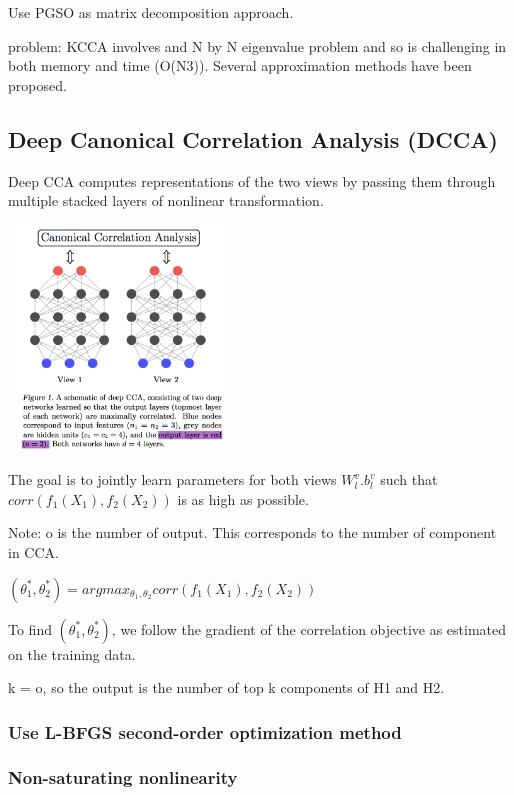 \documentclass[a4paper]{article}
\begin{document}
Use PGSO as matrix decomposition approach.

problem:
KCCA involves and N by N eigenvalue problem and so is challenging in both memory and time (O(N3)). Several approximation methods have been proposed.

\subsection{Deep Canonical Correlation Analysis (DCCA)}
Deep CCA computes representations of the two views by passing them
through multiple stacked layers of nonlinear transformation.

\begin{center}
\includegraphics[width=6cm, height=6cm]{dnet.png}
\end{center}


The goal is to jointly learn parameters for both views $W_l^v. b_l^v$ such that $corr(f_1(X_1),f_2(X_2))$ is as high as possible.

Note: o is the number of output. This corresponds to the number of component in CCA.

$(\theta_1^*,\theta_2^*) = argmax_{\theta_1,\theta_2} corr(f_1(X_1),f_2(X_2))$

To find $(\theta_1^*,\theta_2^*)$, we follow the gradient of the correlation objective as estimated on the training data.

k = o, so the output is the number of top k components of H1 and H2.


\subsubsection{Use L-BFGS second-order optimization method}

\subsubsection{Non-saturating nonlinearity}
\end{document}
